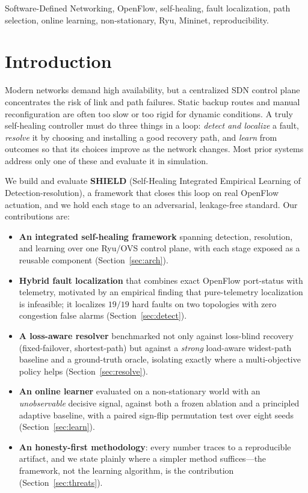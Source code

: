\documentclass[conference]{IEEEtran}
\begin{document}
\begin{IEEEkeywords}
Software-Defined Networking, OpenFlow, self-healing, fault localization, path
selection, online learning, non-stationary, Ryu, Mininet, reproducibility.
\end{IEEEkeywords}

\section{Introduction}
Modern networks demand high availability, but a centralized SDN control plane
concentrates the risk of link and path failures. Static backup routes and manual
reconfiguration are often too slow or too rigid for dynamic conditions. A truly
self-healing controller must do three things in a loop: \emph{detect and localize}
a fault, \emph{resolve} it by choosing and installing a good recovery path, and
\emph{learn} from outcomes so that its choices improve as the network changes. Most
prior systems address only one of these and evaluate it in simulation.

We build and evaluate \textbf{SHIELD} (Self-Healing Integrated Empirical Learning
of Detection-resolution), a framework that closes this loop on real OpenFlow
actuation, and we hold each stage to an adversarial, leakage-free standard. Our
contributions are:
\begin{itemize}
  \item \textbf{An integrated self-healing framework} spanning detection,
  resolution, and learning over one Ryu/OVS control plane, with each stage exposed
  as a reusable component (Section~\ref{sec:arch}).
  \item \textbf{Hybrid fault localization} that combines exact OpenFlow port-status
  with telemetry, motivated by an empirical finding that pure-telemetry localization
  is infeasible; it localizes $19/19$ hard faults on two topologies with zero
  congestion false alarms (Section~\ref{sec:detect}).
  \item \textbf{A loss-aware resolver} benchmarked not only against loss-blind
  recovery (fixed-failover, shortest-path) but against a \emph{strong} load-aware
  widest-path baseline and a ground-truth oracle, isolating exactly where a
  multi-objective policy helps (Section~\ref{sec:resolve}).
  \item \textbf{An online learner} evaluated on a non-stationary world with an
  \emph{unobservable} decisive signal, against both a frozen ablation and a
  principled adaptive baseline, with a paired sign-flip permutation test over eight
  seeds (Section~\ref{sec:learn}).
  \item \textbf{An honesty-first methodology}: every number traces to a reproducible
  artifact, and we state plainly where a simpler method suffices---the framework,
  not the learning algorithm, is the contribution (Section~\ref{sec:threats}).
\end{itemize}
\end{document}
